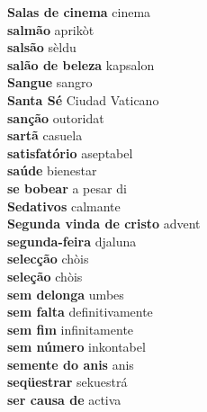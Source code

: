 \textbf{ Salas de cinema  } cinema \\
\textbf{ salmão  } aprikòt \\
\textbf{ salsão  } sèldu \\
\textbf{ salão de beleza  } kapsalon \\
\textbf{ Sangue  } sangro \\
\textbf{ Santa Sé  } Ciudad Vaticano \\
\textbf{ sanção  } outoridat \\
\textbf{ sartã  } casuela \\
\textbf{ satisfatório  } aseptabel \\
\textbf{ saúde  } bienestar \\
\textbf{ se bobear  } a pesar di \\
\textbf{ Sedativos  } calmante \\
\textbf{ Segunda vinda de cristo  } advent \\
\textbf{ segunda-feira  } djaluna \\
\textbf{ selecção  } chòis \\
\textbf{ seleção  } chòis \\
\textbf{ sem delonga  } umbes \\
\textbf{ sem falta  } definitivamente \\
\textbf{ sem fim  } infinitamente \\
\textbf{ sem número  } inkontabel \\
\textbf{ semente do anis  } anis \\
\textbf{ seqüestrar  } sekuestrá \\
\textbf{ ser causa de  } activa \\
